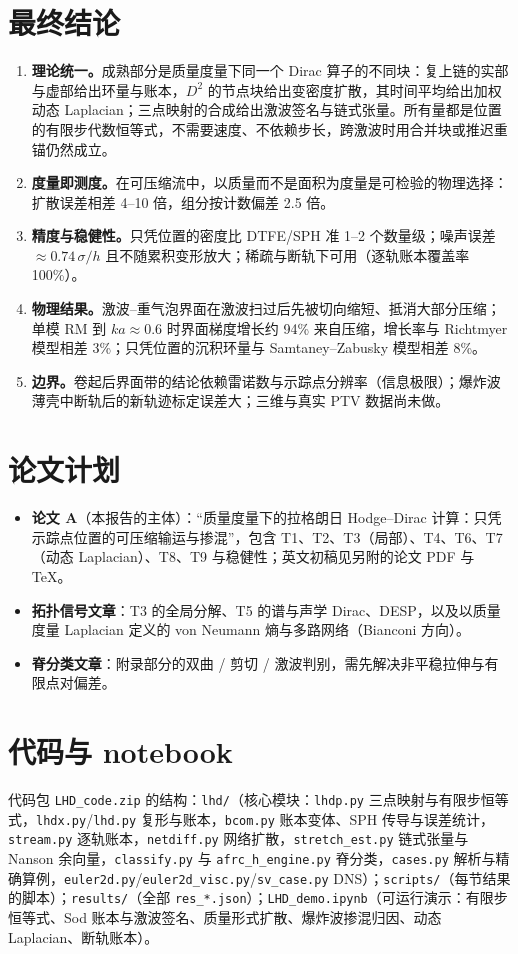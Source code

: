 \section{最终结论}
\begin{enumerate}
\item \textbf{理论统一。}成熟部分是质量度量下同一个 Dirac 算子的不同块：复上链的实部与虚部给出环量与账本，$D^2$ 的节点块给出变密度扩散，其时间平均给出加权动态 Laplacian；三点映射的合成给出激波签名与链式张量。所有量都是位置的有限步代数恒等式，不需要速度、不依赖步长，跨激波时用合并块或推迟重锚仍然成立。
\item \textbf{度量即测度。}在可压缩流中，以质量而不是面积为度量是可检验的物理选择：扩散误差相差 4–10 倍，组分按计数偏差 2.5 倍。
\item \textbf{精度与稳健性。}只凭位置的密度比 DTFE/SPH 准 1–2 个数量级；噪声误差 $\approx0.74\,\sigma/h$ 且不随累积变形放大；稀疏与断轨下可用（逐轨账本覆盖率 100\%）。
\item \textbf{物理结果。}激波–重气泡界面在激波扫过后先被切向缩短、抵消大部分压缩；单模 RM 到 $ka\approx0.6$ 时界面梯度增长约 94\% 来自压缩，增长率与 Richtmyer 模型相差 3\%；只凭位置的沉积环量与 Samtaney–Zabusky 模型相差 8\%。
\item \textbf{边界。}卷起后界面带的结论依赖雷诺数与示踪点分辨率（信息极限）；爆炸波薄壳中断轨后的新轨迹标定误差大；三维与真实 PTV 数据尚未做。
\end{enumerate}

\section{论文计划}
\begin{itemize}
\item \textbf{论文 A}（本报告的主体）：“质量度量下的拉格朗日 Hodge–Dirac 计算：只凭示踪点位置的可压缩输运与掺混”，包含 T1、T2、T3（局部）、T4、T6、T7（动态 Laplacian）、T8、T9 与稳健性；英文初稿见另附的论文 PDF 与 TeX。
\item \textbf{拓扑信号文章}：T3 的全局分解、T5 的谱与声学 Dirac、DESP，以及以质量度量 Laplacian 定义的 von Neumann 熵与多路网络（Bianconi 方向）。
\item \textbf{脊分类文章}：附录部分的双曲 / 剪切 / 激波判别，需先解决非平稳拉伸与有限点对偏差。
\end{itemize}

\section{代码与 notebook}
代码包 \texttt{LHD\_code.zip} 的结构：\texttt{lhd/}（核心模块：\texttt{lhdp.py} 三点映射与有限步恒等式，\texttt{lhdx.py}/\texttt{lhd.py} 复形与账本，\texttt{bcom.py} 账本变体、SPH 传导与误差统计，\texttt{stream.py} 逐轨账本，\texttt{netdiff.py} 网络扩散，\texttt{stretch\_est.py} 链式张量与 Nanson 余向量，\texttt{classify.py} 与 \texttt{afrc\_h\_engine.py} 脊分类，\texttt{cases.py} 解析与精确算例，\texttt{euler2d.py}/\texttt{euler2d\_visc.py}/\texttt{sv\_case.py} DNS）；\texttt{scripts/}（每节结果的脚本）；\texttt{results/}（全部 \texttt{res\_*.json}）；\texttt{LHD\_demo.ipynb}（可运行演示：有限步恒等式、Sod 账本与激波签名、质量形式扩散、爆炸波掺混归因、动态 Laplacian、断轨账本）。

